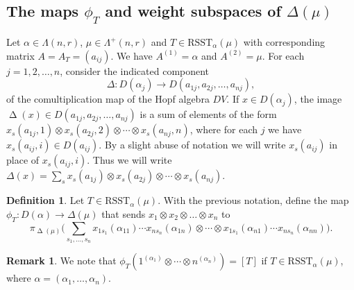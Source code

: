 \documentclass[11pt]{article}
\theoremstyle{definition}
\newtheorem{defi}[theo]{Definition}
\newtheorem{rema}[theo]{Remark}
\numberwithin{equation}{section}
\newcommand{\al}{\alpha}
\newcommand{\La}{\Lambda}
\DeclareMathOperator{\D}{\mathrm{\Delta}}
\numberwithin{equation}{section}
\begin{document}
\subsection{The maps \texorpdfstring{$\phi_T$}{phi\_T} and weight subspaces of \texorpdfstring{$\Delta(\mu)$}{Delta(mu)}}\label{s2.3} Let $\al \in \La(n,r)$, $\mu \in \La^{+}(n,r)$ and $T \in  \mathrm{RSST}_{\al}(\mu)$ with corresponding matrix $A=A_T=(a_{ij})$. We have $A^{(1)}=\al $ and $A^{(2)}=\mu$. For each $j=1,2,\dots,n$, consider the indicated component \begin{equation}\label{D} \Delta: D(\al_j) \to D(a_{1j},a_{2j},\dots,a_{nj}),\end{equation} of the comultiplication map of the Hopf algebra $DV$. If $x \in D(\al_j)$, the image $\D(x) \in D(a_{1j},a_{2j},\dots,a_{nj})$ is a sum of elements of the form $x_s(a_{1j},1) \otimes x_s(a_{2j},2) \otimes \cdots \otimes x_s(a_{nj},n)$, where for each $j$ we have $x_s(a_{ij},i) \in D(a_{ij})$. By a slight abuse of notation we will write $x_s(a_{ij})$ in place of $x_s(a_{ij},i)$. Thus we will write $\Delta(x) = \sum_{s}x_s(a_{1j}) \otimes x_s(a_{2j}) \otimes \cdots \otimes x_s(a_{nj})$.
\begin{defi}\label{def2.4}
	Let $T \in \mathrm{RSST}_{\al}(\mu)$. With the previous notation, define the map $ \phi_{T}:D(\al) \to \Delta(\mu)$ that sends  $x_1 \otimes x_2 \otimes \dots\otimes x_n$ to \[\pi_{\D(\mu)} \big( \sum_{s_1,\dots,s_n}x_{1s_1}(\al_{11}) \cdots x_{ns_n}(\al_{1n}) \otimes  \cdots \otimes x_{1s_1}(\al_{n1})\cdots x_{ns_n}(\al_{nn}) \big). \]
\end{defi}
\begin{rema}\label{remarkphi}
	We note that $\phi_T(1^{(\al_1)} \otimes \cdots \otimes n^{(\al_n)} )=[T]$ if $T \in \mathrm{RSST}_{\al}(\mu)$, where $\al = (\al_1,\dots,\al_n).$
\end{rema}
\end{document}
